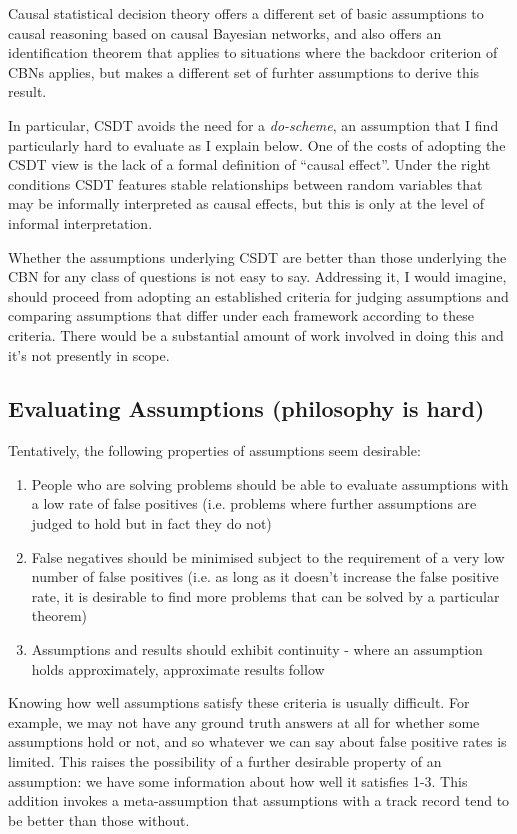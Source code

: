 

Causal statistical decision theory offers a different set of basic assumptions to causal reasoning based on causal Bayesian networks, and also offers an identification theorem that applies to situations where the backdoor criterion of CBNs applies, but makes a different set of furhter assumptions to derive this result.

In particular, CSDT avoids the need for a \emph{do-scheme}, an assumption that I find particularly hard to evaluate as I explain below. One of the costs of adopting the CSDT view is the lack of a formal definition of ``causal effect''. Under the right conditions CSDT features stable relationships between random variables that may be informally interpreted as causal effects, but this is only at the level of informal interpretation.

Whether the assumptions underlying CSDT are better than those underlying the CBN for any class of questions is not easy to say. Addressing it, I would imagine, should proceed from adopting an established criteria for judging assumptions and comparing assumptions that differ under each framework according to these criteria. There would be a substantial amount of work involved in doing this and it's not presently in scope.

\subsection{Evaluating Assumptions (philosophy is hard)}

Tentatively, the following properties of assumptions seem desirable:
\begin{enumerate}
	\item People who are solving problems should be able to evaluate assumptions with a low rate of false positives (i.e. problems where further assumptions are judged to hold but in fact they do not)
	\item False negatives should be minimised subject to the requirement of a very low number of false positives (i.e. as long as it doesn't increase the false positive rate, it is desirable to find more problems that can be solved by a particular theorem)
	\item Assumptions and results should exhibit continuity - where an assumption holds approximately, approximate results follow
\end{enumerate}

Knowing how well assumptions satisfy these criteria is usually difficult. For example, we may not have any ground truth answers at all for whether some assumptions hold or not, and so whatever we can say about false positive rates is limited. This raises the possibility of a further desirable property of an assumption: we have some information about how well it satisfies 1-3. This addition invokes a meta-assumption that assumptions with a track record tend to be better than those without.

